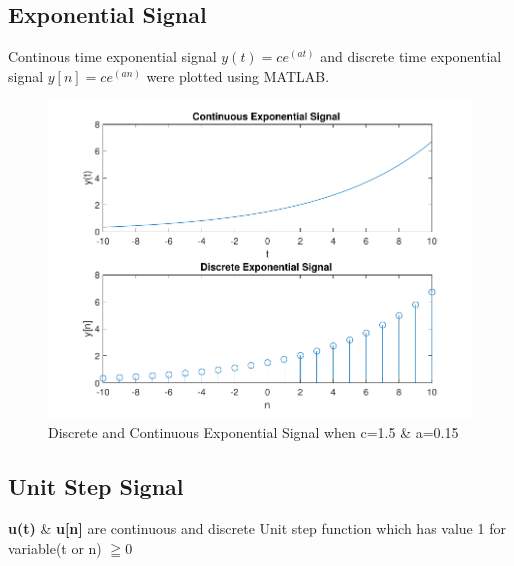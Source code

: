 \documentclass{article}
\begin{document}
\subsection{Exponential Signal}
Continous time exponential signal $y(t)=ce^(at)$ and discrete time exponential signal $y[n]=ce^(an)$ were plotted using MATLAB.


\begin{figure}[H]
    \centering
    \includegraphics[scale=1.4,cframe=blue 0.5pt 3pt]{./FIG/exp}
    \caption{Discrete and Continuous Exponential Signal when c=1.5 \& a=0.15 }
\end{figure}

\subsection{Unit Step Signal}
\textbf{u(t) }  \&  \textbf{ u[n] } are continuous and discrete Unit step function which has value 1 for variable(t or n) $\geqq 0$
\end{document}
